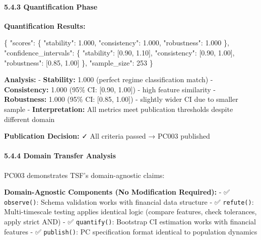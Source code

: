 \documentclass[
]{article}
\newenvironment{Shaded}{}{}
\newcommand{\DataTypeTok}[1]{\textcolor[rgb]{0.56,0.13,0.00}{#1}}
\newcommand{\DecValTok}[1]{\textcolor[rgb]{0.25,0.63,0.44}{#1}}
\newcommand{\FloatTok}[1]{\textcolor[rgb]{0.25,0.63,0.44}{#1}}
\newcommand{\FunctionTok}[1]{\textcolor[rgb]{0.02,0.16,0.49}{#1}}
\newcommand{\OtherTok}[1]{\textcolor[rgb]{0.00,0.44,0.13}{#1}}
\begin{document}
\paragraph{5.4.3 Quantification Phase}\label{quantification-phase-1}

\textbf{Quantification Results:}

\begin{Shaded}
\begin{Highlighting}[]
\FunctionTok{\{}
  \DataTypeTok{"scores"}\FunctionTok{:} \FunctionTok{\{}
    \DataTypeTok{"stability"}\FunctionTok{:} \FloatTok{1.000}\FunctionTok{,}
    \DataTypeTok{"consistency"}\FunctionTok{:} \FloatTok{1.000}\FunctionTok{,}
    \DataTypeTok{"robustness"}\FunctionTok{:} \FloatTok{1.000}
  \FunctionTok{\},}
  \DataTypeTok{"confidence\_intervals"}\FunctionTok{:} \FunctionTok{\{}
    \DataTypeTok{"stability"}\FunctionTok{:} \OtherTok{[}\FloatTok{0.90}\OtherTok{,} \FloatTok{1.10}\OtherTok{]}\FunctionTok{,}
    \DataTypeTok{"consistency"}\FunctionTok{:} \OtherTok{[}\FloatTok{0.90}\OtherTok{,} \FloatTok{1.00}\OtherTok{]}\FunctionTok{,}
    \DataTypeTok{"robustness"}\FunctionTok{:} \OtherTok{[}\FloatTok{0.85}\OtherTok{,} \FloatTok{1.00}\OtherTok{]}
  \FunctionTok{\},}
  \DataTypeTok{"sample\_size"}\FunctionTok{:} \DecValTok{253}
\FunctionTok{\}}
\end{Highlighting}
\end{Shaded}

\textbf{Analysis:} - \textbf{Stability:} 1.000 (perfect regime
classification match) - \textbf{Consistency:} 1.000 (95\% CI: {[}0.90,
1.00{]}) - high feature similarity - \textbf{Robustness:} 1.000 (95\%
CI: {[}0.85, 1.00{]}) - slightly wider CI due to smaller sample -
\textbf{Interpretation:} All metrics meet publication thresholds despite
different domain

\textbf{Publication Decision:} ✓ All criteria passed → PC003 published

\paragraph{5.4.4 Domain Transfer
Analysis}\label{domain-transfer-analysis}

PC003 demonstrates TSF's domain-agnostic claims:

\textbf{Domain-Agnostic Components (No Modification Required):} - ✅
\texttt{observe()}: Schema validation works with financial data
structure - ✅ \texttt{refute()}: Multi-timescale testing applies
identical logic (compare features, check tolerances, apply strict AND) -
✅ \texttt{quantify()}: Bootstrap CI estimation works with financial
features - ✅ \texttt{publish()}: PC specification format identical to
population dynamics
\end{document}
